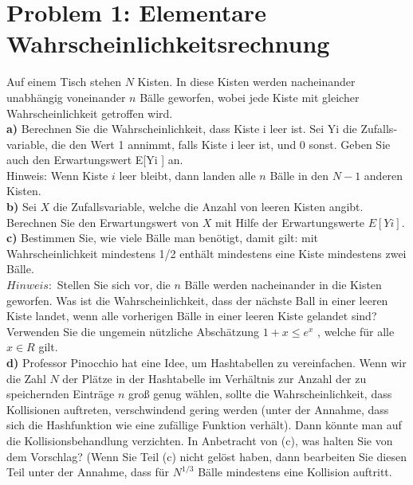 \section*{{Problem 1: Elementare Wahrscheinlichkeitsrechnung}}

Auf einem Tisch stehen $N$ Kisten. In diese Kisten werden nacheinander unabhängig voneinander $n$ Bälle geworfen, wobei jede Kiste mit gleicher Wahrscheinlichkeit getroffen wird.\\

\noindent
\textbf{a)} Berechnen Sie die Wahrscheinlichkeit, dass Kiste i leer ist. Sei Yi die Zufalls-
variable, die den Wert 1 annimmt, falls Kiste i leer ist, und 0 sonst. Geben Sie
auch den Erwartungswert E[Yi ] an.\\
Hinweis: Wenn Kiste $i$ leer bleibt, dann landen alle $n$ Bälle in den $N - 1$ anderen Kisten.\\

\noindent
\textbf{b)} Sei $X$ die Zufallsvariable, welche die Anzahl von leeren Kisten angibt. Berechnen Sie den Erwartungswert von $X$ mit Hilfe der Erwartungswerte $E[Yi]$.\\

\noindent
\textbf{c)} Bestimmen Sie, wie viele Bälle man benötigt, damit gilt: mit Wahrscheinlichkeit mindestens 1/2 enthält mindestens eine Kiste mindestens zwei Bälle.\\ 
$Hinweis:$ Stellen Sie sich vor, die $n$ Bälle werden nacheinander in die Kisten
geworfen. Was ist die Wahrscheinlichkeit, dass der nächste Ball in einer leeren Kiste landet, wenn alle vorherigen Bälle in einer leeren Kiste gelandet sind? Verwenden Sie die ungemein nützliche Abschätzung $1 + x \leq e^x$ , welche für alle $x \in R$ gilt.\\

\noindent
\textbf{d)} Professor Pinocchio hat eine Idee, um Hashtabellen zu vereinfachen. Wenn
wir die Zahl $N$ der Plätze in der Hashtabelle im Verhältnis zur Anzahl der zu
speichernden Einträge $n$ groß genug wählen, sollte die Wahrscheinlichkeit, dass
Kollisionen auftreten, verschwindend gering werden (unter der Annahme, dass
sich die Hashfunktion wie eine zufällige Funktion verhält). Dann könnte man
auf die Kollisionsbehandlung verzichten. In Anbetracht von (c), was halten Sie
von dem Vorschlag? (Wenn Sie Teil (c) nicht gelöst haben, dann bearbeiten Sie
diesen Teil unter der Annahme, dass für $N^{1/3}$ Bälle mindestens eine Kollision
auftritt.\\